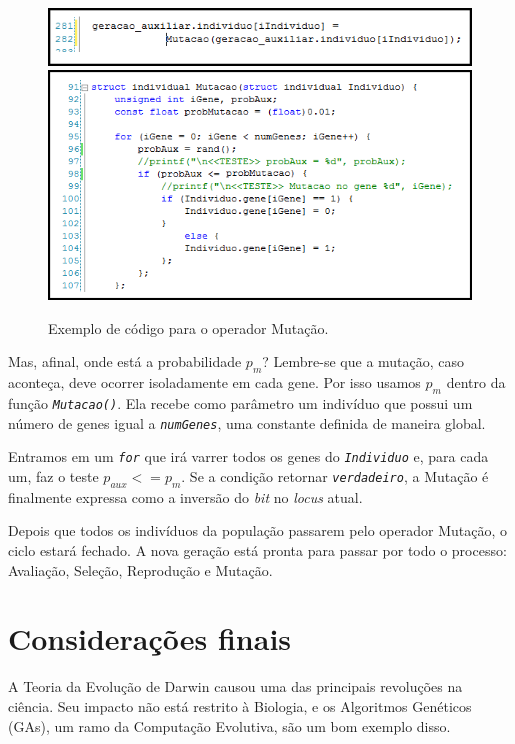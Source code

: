 	\begin{figure}[htp]
		\begin{center}
			\includegraphics[width=13cm]{figs/ga/CodigoMutacao.png}
			\includegraphics[width=13cm]{figs/ga/CodigoMutacaoFunc.png}
		\end{center}
		\caption{\label{figCodMutacao}Exemplo de código para o operador Mutação.}
	\end{figure}
		
	Mas, afinal, onde está a probabilidade $p_m$? Lembre-se que a mutação, caso aconteça, deve ocorrer isoladamente em cada gene. Por isso usamos $p_m$ dentro da função \textit{\texttt{Mutacao()}}. Ela recebe como parâmetro um indivíduo que possui um número de genes igual a \textit{\texttt{numGenes}}, uma constante definida de maneira global.
	
	Entramos em um \textit{\texttt{for}} que irá varrer todos os genes do \textit{\texttt{Individuo}} e, para cada um, faz o teste $p_{aux} <= p_m$. Se a condição retornar \textit{\texttt{verdadeiro}}, a Mutação é finalmente expressa como a inversão do \textit{bit} no \textit{locus} atual.
	
	Depois que todos os indivíduos da população passarem pelo operador Mutação, o ciclo estará fechado. A nova geração está pronta para passar por todo o processo: Avaliação, Seleção, Reprodução e Mutação.
	
	\section{Considerações finais}
	
	A Teoria da Evolução de Darwin causou uma das principais revoluções na ciência. Seu impacto não está restrito à Biologia, e os Algoritmos Genéticos (GAs), um ramo da Computação Evolutiva, são um bom exemplo disso.
	
